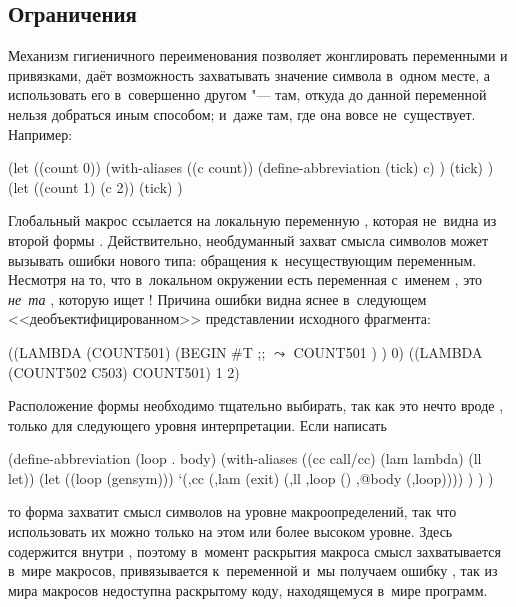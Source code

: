 \subsection{Ограничения}\label{macros/macrosystem/ssect:limits}

Механизм гигиеничного переименования позволяет жонглировать переменными и
привязками, даёт возможность захватывать значение символа в~одном месте, а
использовать его в~совершенно другом "--- там, откуда до данной переменной
нельзя добраться иным способом; и~даже там, где она вовсе не~существует.
Например:


\begin{code:lisp}
(let ((count 0))
  (with-aliases ((c count))
    (define-abbreviation (tick) c) )
  (tick) )
(let ((count 1) (c 2))
  (tick) )
\end{code:lisp}

Глобальный макрос  ссылается на локальную переменную ,
которая не~видна из второй формы . Действительно, необдуманный захват
смысла символов может вызывать ошибки нового типа: обращения к~несуществующим
переменным. Несмотря на то, что в~локальном окружении есть переменная с~именем
, это \emph{не~та} , которую ищет ! Причина ошибки
видна яснее в~следующем <<деобъектифицированном>> представлении исходного
фрагмента:

\begin{code:lisp}
((LAMBDA (COUNT501)
   (BEGIN #T ;;  $\leadsto$ 
          COUNT501 ) ) 0)
((LAMBDA (COUNT502 C503) COUNT501) 1 2)
\end{code:lisp}


Расположение формы  необходимо тщательно выбирать, так как это
нечто вроде , только для следующего уровня интерпретации. Если написать

\begin{code:lisp}
(define-abbreviation (loop . body)
  (with-aliases ((cc call/cc) (lam lambda) (ll let))
    (let ((loop (gensym)))
      `(,cc (,lam (exit) (,ll ,loop () ,@body (,loop)))) ) ) )
\end{code:lisp}

\noindent
то форма  захватит смысл символов на уровне макроопределений,
так что использовать их можно только на этом или более высоком уровне. Здесь
 содержится внутри , поэтому в~момент
раскрытия макроса  смысл  захватывается в~мире макросов,
привязывается к~переменной  и\textdots\ мы получаем ошибку , так  из мира макросов недоступна раскрытому коду,
находящемуся в~мире программ.

